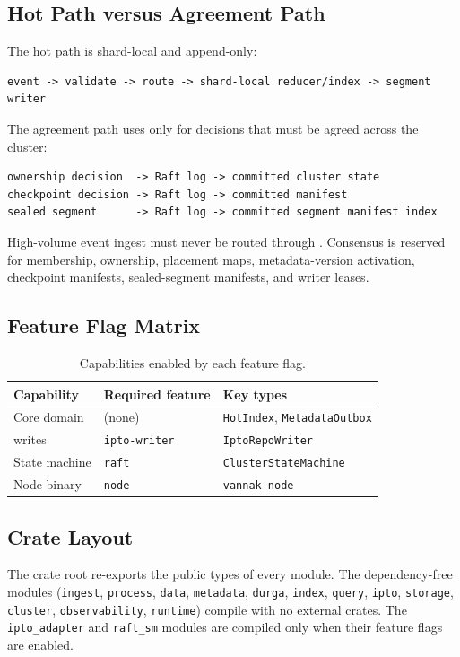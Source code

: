 \subsection{Hot Path versus Agreement Path}

The hot path is shard-local and append-only:

\begin{lstlisting}[numbers=none]
event -> validate -> route -> shard-local reducer/index -> segment writer
\end{lstlisting}

The agreement path uses \raft{} only for decisions that must be agreed across
the cluster:

\begin{lstlisting}[numbers=none]
ownership decision  -> Raft log -> committed cluster state
checkpoint decision -> Raft log -> committed manifest
sealed segment      -> Raft log -> committed segment manifest index
\end{lstlisting}

\begin{vnote}
High-volume event ingest must never be routed through \raft{}. Consensus is
reserved for membership, ownership, placement maps, metadata-version
activation, checkpoint manifests, sealed-segment manifests, and writer leases.
\end{vnote}

\subsection{Feature Flag Matrix}

\begin{table}[htbp]
\centering
\begin{tabular}{lll}
\hline
Capability & Required feature & Key types \\
\hline
Core domain & (none) & \texttt{HotIndex}, \texttt{MetadataOutbox} \\
\ipto{} writes & \texttt{ipto-writer} & \texttt{IptoRepoWriter} \\
State machine & \texttt{raft} & \texttt{ClusterStateMachine} \\
Node binary & \texttt{node} & \texttt{vannak-node} \\
\hline
\end{tabular}
\caption{Capabilities enabled by each feature flag.}
\end{table}

\subsection{Crate Layout}

The crate root re-exports the public types of every module. The dependency-free
modules (\texttt{ingest}, \texttt{process}, \texttt{data}, \texttt{metadata},
\texttt{durga}, \texttt{index}, \texttt{query}, \texttt{ipto},
\texttt{storage}, \texttt{cluster}, \texttt{observability}, \texttt{runtime})
compile with no external crates. The \texttt{ipto\_adapter} and
\texttt{raft\_sm} modules are compiled only when their feature flags are
enabled.

\endinput

